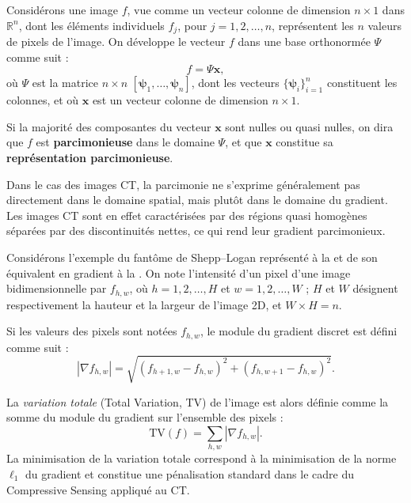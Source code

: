 \begin{definition}
Considérons une image $f$, vue comme un vecteur colonne de dimension $n \times 1$ dans $\mathbb{R}^n$, dont les éléments individuels $f_j$, pour $j = 1, 2, \ldots, n$, représentent les $n$ valeurs de pixels de l'image. On développe le vecteur $f$ dans une base orthonormée $\Psi$ comme suit :
\begin{equation}
f = \Psi \mathbf{x},
\end{equation}
où $\Psi$ est la matrice $n \times n$ $[\boldsymbol{\psi}_1, \ldots, \boldsymbol{\psi}_n]$, dont les vecteurs $\{\boldsymbol{\psi}_i\}_{i=1}^{n}$ constituent les colonnes, et où $\mathbf{x}$ est un vecteur colonne de dimension $n \times 1$.  

Si la majorité des composantes du vecteur $\mathbf{x}$ sont nulles ou quasi nulles, on dira que $f$ est \textbf{parcimonieuse} dans le domaine $\Psi$, et que $\mathbf{x}$ constitue sa \textbf{représentation parcimonieuse}.
\end{definition}

Dans le cas des images CT, la parcimonie ne s'exprime généralement pas directement dans le domaine spatial, mais plutôt dans le domaine du gradient. Les images CT sont en effet caractérisées par des régions quasi homogènes séparées par des discontinuités nettes, ce qui rend leur gradient parcimonieux.

Considérons l'exemple du fantôme de Shepp--Logan représenté à la  et de son équivalent en gradient à la . On note l'intensité d'un pixel d'une image bidimensionnelle par $f_{h,w}$, où $h = 1,2,\ldots,H$ et $w = 1,2,\ldots,W$ ; $H$ et $W$ désignent respectivement la hauteur et la largeur de l'image 2D, et $W \times H = n$.

\begin{definition}
Si les valeurs des pixels sont notées $f_{h,w}$, le module du gradient discret est défini comme suit :
\begin{equation}
\left| \nabla f_{h,w} \right|
=
\sqrt{
\left( f_{h+1,w} - f_{h,w} \right)^2
+
\left( f_{h,w+1} - f_{h,w} \right)^2
}.
\label{eq:gradient-modulus}
\end{equation}
\end{definition}

La \emph{variation totale} (Total Variation, TV) de l'image est alors définie comme la somme du module du gradient sur l'ensemble des pixels :
\begin{equation}
\mathrm{TV}(f) = \sum_{h,w} \left| \nabla f_{h,w} \right|.
\end{equation}
La minimisation de la variation totale correspond à la minimisation de la norme $\ell_1$ du gradient et constitue une pénalisation standard dans le cadre du Compressive Sensing appliqué au CT.

